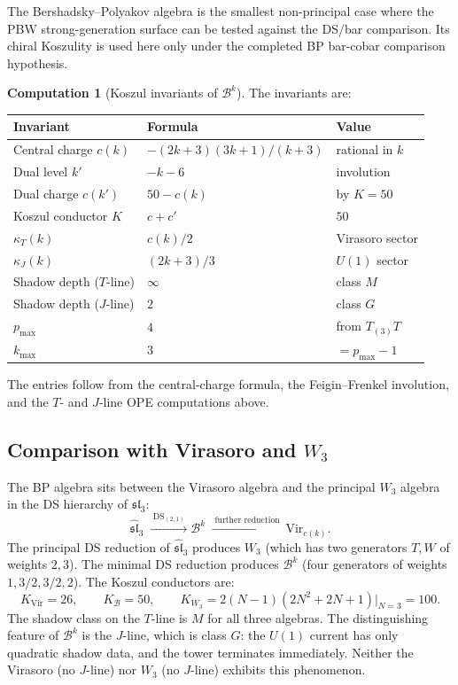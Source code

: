 \documentclass[11pt]{article}
\theoremstyle{plain}
\theoremstyle{definition}
\newtheorem{computation}[theorem]{Computation}
\theoremstyle{remark}
\newcommand{\fsl}{\mathfrak{sl}}
\newcommand{\cB}{\mathcal{B}}
\newcommand{\DS}{\mathrm{DS}}
\newcommand{\Vir}{\mathrm{Vir}}
\numberwithin{equation}{section}
\begin{document}
The Bershadsky--Polyakov algebra is the smallest non-principal case
where the PBW strong-generation surface can be tested against the
DS/bar comparison. Its chiral Koszulity is used here only under the
completed BP bar-cobar comparison hypothesis.

\begin{computation}[Koszul invariants of $\cB^k$]
\label{comp:bp-invariants}
The invariants are:
\begin{center}
\renewcommand{\arraystretch}{1.35}
\begin{tabular}{lll}
\toprule
\textbf{Invariant} & \textbf{Formula} & \textbf{Value} \\
\midrule
Central charge $c(k)$
 & $-(2k+3)(3k+1)/(k+3)$
 & rational in $k$ \\
Dual level $k'$
 & $-k-6$
 & involution \\
Dual charge $c(k')$
 & $50 - c(k)$
 & by $K = 50$ \\
Koszul conductor $K$
 & $c + c'$
 & $50$ \\
$\kappa_T(k)$
 & $c(k)/2$
 & Virasoro sector \\
$\kappa_J(k)$
 & $(2k+3)/3$
 & $U(1)$ sector \\
Shadow depth ($T$-line)
 & $\infty$
 & class $M$ \\
Shadow depth ($J$-line)
 & $2$
 & class $G$ \\
$p_{\max}$
 & $4$
 & from $T_{(3)}T$ \\
$k_{\max}$
 & $3$
 & $= p_{\max} - 1$ \\
\bottomrule
\end{tabular}
\end{center}
The entries follow from the central-charge formula, the
Feigin--Frenkel involution, and the $T$- and $J$-line OPE
computations above.
\end{computation}

\subsection{Comparison with Virasoro and $W_3$}

The BP algebra sits between the Virasoro algebra and the principal
$W_3$ algebra in the DS hierarchy of $\fsl_3$:
\[
 \widehat{\fsl}_3
 \;\xrightarrow{\;\DS_{(2,1)}\;}
 \cB^k
 \;\xrightarrow{\;\text{further reduction}\;}
 \Vir_{c(k)}.
\]
The principal DS reduction of $\widehat{\fsl}_3$ produces $W_3$ (which
has two generators $T, W$ of weights $2, 3$). The minimal DS
reduction produces $\cB^k$ (four generators of weights $1, 3/2, 3/2,
2$). The Koszul conductors are:
\[
 K_{\Vir} = 26,
 \qquad
	K_{\cB} = 50,
	\qquad
	K_{W_3} = 2(N-1)(2N^2+2N+1)\big|_{N=3}=100.
\]
The shadow class on the $T$-line is $M$ for all three algebras.
The distinguishing feature of $\cB^k$ is the $J$-line, which is
class $G$: the $U(1)$ current has only quadratic shadow data, and the
tower terminates immediately. Neither the Virasoro (no $J$-line) nor
$W_3$ (no $J$-line) exhibits this phenomenon.
\end{document}
